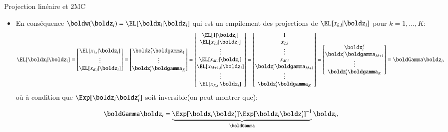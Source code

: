 \begin{frame}[allowframebreaks]{Projection linéaire et 2MC}
\begin{itemize}
\framebreak

\item En conséquence $\boldw(\boldz_i) = \EL[\boldx_i|\boldz_i]$ 
qui est un empilement des projections de $\EL[x_{k,i}|\boldz_i]$ pour $k=1, \ldots, K$:
\[
\EL[\boldx_i|\boldz_i] \equiv
\begin{bmatrix}
    \EL[x_{1,i}|\boldz_i]\\
    \vdots\\
    \EL[x_{K,i}|\boldz_i]
\end{bmatrix}
\equiv 
\begin{bmatrix}
    \boldz_i^\prime\boldgamma_1\\
    \vdots\\
    \boldz_i^\prime\boldgamma_K
\end{bmatrix}
=
\begin{bmatrix}
    \EL[1|\boldz_i]\\
    \EL[x_{2, i}|\boldz_i]\\
    \vdots\\
    \EL[x_{M, i}|\boldz_i]\\
    \EL[x_{M+1, i}|\boldz_i]\\
    \vdots\\
    \EL[x_{K, i}|\boldz_i]\\
\end{bmatrix}
=
\begin{bmatrix}
    1\\
    x_{2, i}\\
    \vdots\\
    x_{M, i}\\
    \boldz_i^\prime\boldgamma_{M+1}\\
    \vdots\\
    \boldz_i^\prime\boldgamma_K
\end{bmatrix}
=
\begin{bmatrix}
    \boldx_i^x\\
    \boldz_i^\prime\boldgamma_{M+1}\\
    \vdots\\
    \boldz_i^\prime\boldgamma_K
\end{bmatrix}
\equiv
\boldGamma\boldz_i,
\]
où à condition que  $\Exp[\boldz_i\boldz_i^\prime]$ soit inversible(on peut montrer que):

\begin{align}
    \boldGamma \boldz_i &= \underbrace{\Exp[\boldx_i\boldz_i^\prime]\Exp[\boldz_i\boldz_i^\prime]^{-1}}_{\boldGamma}\boldz_i,
    \label{eq19}
\end{align}


\end{itemize}
\end{frame}
